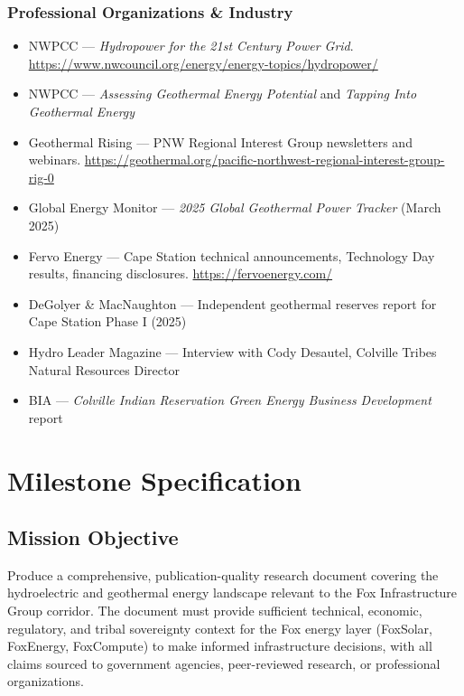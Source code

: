 \documentclass[11pt,letterpaper]{article}
\newcommand{\stageheader}[2]{%
  \noindent\colorbox{#2}{\makebox[\textwidth][l]{%
    \textcolor{white}{\bfseries\sffamily\hspace{6pt}#1\hspace{6pt}}}}%
  \vspace{0.5em}\par%
}
\begin{document}
\subsubsection{Professional Organizations \& Industry}
\begin{itemize}[leftmargin=2em]
\item NWPCC --- \textit{Hydropower for the 21st Century Power Grid}. \url{https://www.nwcouncil.org/energy/energy-topics/hydropower/}
\item NWPCC --- \textit{Assessing Geothermal Energy Potential} and \textit{Tapping Into Geothermal Energy}
\item Geothermal Rising --- PNW Regional Interest Group newsletters and webinars. \url{https://geothermal.org/pacific-northwest-regional-interest-group-rig-0}
\item Global Energy Monitor --- \textit{2025 Global Geothermal Power Tracker} (March 2025)
\item Fervo Energy --- Cape Station technical announcements, Technology Day results, financing disclosures. \url{https://fervoenergy.com/}
\item DeGolyer \& MacNaughton --- Independent geothermal reserves report for Cape Station Phase I (2025)
\item Hydro Leader Magazine --- Interview with Cody Desautel, Colville Tribes Natural Resources Director
\item BIA --- \textit{Colville Indian Reservation Green Energy Business Development} report
\end{itemize}

\newpage

\stageheader{STAGE 3 --- MISSION PACKAGE}{tertiary}

\section{Milestone Specification}

\subsection{Mission Objective}

Produce a comprehensive, publication-quality research document covering the hydroelectric and geothermal energy landscape relevant to the Fox Infrastructure Group corridor. The document must provide sufficient technical, economic, regulatory, and tribal sovereignty context for the Fox energy layer (FoxSolar, FoxEnergy, FoxCompute) to make informed infrastructure decisions, with all claims sourced to government agencies, peer-reviewed research, or professional organizations.
\end{document}
